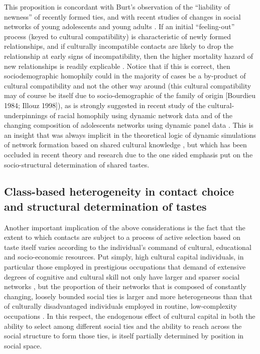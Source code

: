  This proposition is concordant with Burt's  observation of the ``liability of newness'' of recently formed ties, and with recent studies of changes in social networks of young adolescents and young adults \citep{bidart_degenne05, bidart_lavenu05, cardon_granjon05}.  If an initial ``feeling-out'' process (keyed to cultural compatibility) is characteristic of newly formed relationships, and if culturally incompatible contacts are likely to drop the relationship at early signs of incompatibility, then the higher mortality hazard of new relationships is readily explicable \citep{vaisey_lizardo10}.  Notice that if this is correct, then sociodemographic homophily could in the majority of cases be a by-product of cultural compatibility and not the other way around (this cultural compatibility may of course be itself due to socio-demographic of the family of origin [Bourdieu 1984; Illouz 1998]), as is strongly suggested in recent study of the cultural-underpinnings of racial homophily using dynamic network data \citep{wimmer_lewis10} and of the changing composition of adolescents networks using dynamic panel data \citep{vaisey_lizardo10}.  This is an insight that was always implicit in the theoretical logic of dynamic simulations of network formation based on shared cultural knowledge \citep{carley91, dimaggio93b}, but which has been occluded in recent theory and research due to the one sided emphasis put on the socio-structural determination of shared tastes.  
 
\subsection{Class-based heterogeneity in contact choice and structural determination of tastes}
Another important implication of the above considerations is the fact that the extent to which contacts are subject to a process of active selection based on taste itself varies according to the individual's command of cultural, educational and socio-economic resources.  Put simply, high cultural capital individuals, in particular those employed in prestigious occupations that demand of extensive degrees of cognitive and cultural skill not only have larger and sparser social networks \citep{lizardo06a}, but the proportion of their networks that is composed of constantly changing, loosely bounded social ties is larger and more heterogeneous than that of culturally disadvantaged individuals employed in routine, low-complexity occupations \citep{coser91, fischer82}.   In this respect, the endogenous effect of cultural capital in both the ability to select among different social ties and the ability to reach across the social structure to form those ties, is itself partially determined by position in social space. 
 
